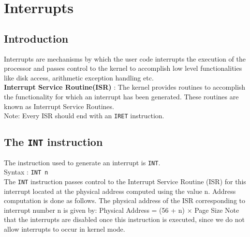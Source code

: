 \documentclass[11pt]{article}
\begin{document}
\section{Interrupts}
\label{sec:int}

\subsection{Introduction}
Interrupts are mechanisms by which the user code interrupts the execution of the processor and passes control to the kernel to accomplish low level functionalities like disk access, arithmetic exception handling etc.\\
\textbf{Interrupt Service Routine(ISR)} : The kernel provides routines to accomplish the functionality for which an interrupt has been generated. These routines are known as Interrupt Service Routines.\\
Note: Every ISR should end with an \texttt{IRET} instruction.

\subsection{The \texttt{INT} instruction}
The instruction used to generate an interrupt is \texttt{INT}.\\
Syntax : \texttt{INT n}\\
The \texttt{INT} instruction passes control to the Interrupt Service Routine (ISR) for this interrupt located at the physical address computed using the value n.
Address computation is done as follows. The physical address of the ISR corresponding to interrupt number n is given by:
Physical Address = (56 + n) × Page Size
Note that the interrupts are disabled once this instruction is executed, since we do not allow interrupts to occur in kernel mode.
\end{document}
